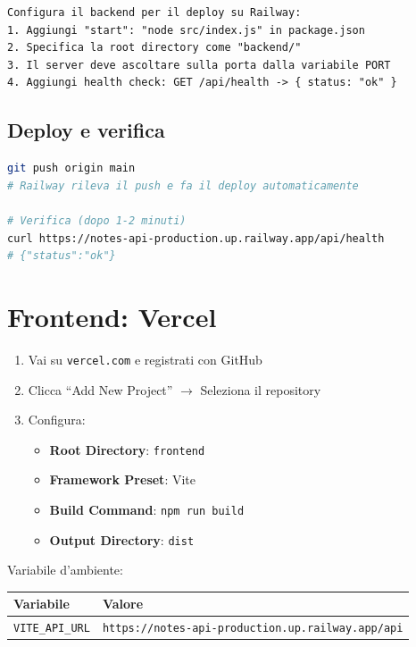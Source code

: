 \begin{praticabox}[title={Pratica --- Configura il build}]
\begin{lstlisting}[language={}]
Configura il backend per il deploy su Railway:
1. Aggiungi "start": "node src/index.js" in package.json
2. Specifica la root directory come "backend/"
3. Il server deve ascoltare sulla porta dalla variabile PORT
4. Aggiungi health check: GET /api/health -> { status: "ok" }
\end{lstlisting}
\end{praticabox}

\subsection{Deploy e verifica}

\begin{lstlisting}[language=bash]
git push origin main
# Railway rileva il push e fa il deploy automaticamente

# Verifica (dopo 1-2 minuti)
curl https://notes-api-production.up.railway.app/api/health
# {"status":"ok"}
\end{lstlisting}

\section{Frontend: Vercel}

\begin{praticabox}[title={Pratica --- Setup Vercel}]
\begin{enumerate}
  \item Vai su \texttt{vercel.com} e registrati con GitHub
  \item Clicca ``Add New Project'' $\rightarrow$ Seleziona il repository
  \item Configura:
  \begin{itemize}
    \item \textbf{Root Directory}: \texttt{frontend}
    \item \textbf{Framework Preset}: Vite
    \item \textbf{Build Command}: \texttt{npm run build}
    \item \textbf{Output Directory}: \texttt{dist}
  \end{itemize}
\end{enumerate}
\end{praticabox}

Variabile d'ambiente:
\begin{center}
\begin{tabularx}{\textwidth}{l X}
\toprule
\textbf{Variabile} & \textbf{Valore} \\
\midrule
\texttt{VITE\_API\_URL} & \texttt{https://notes-api-production.up.railway.app/api} \\
\bottomrule
\end{tabularx}
\end{center}

